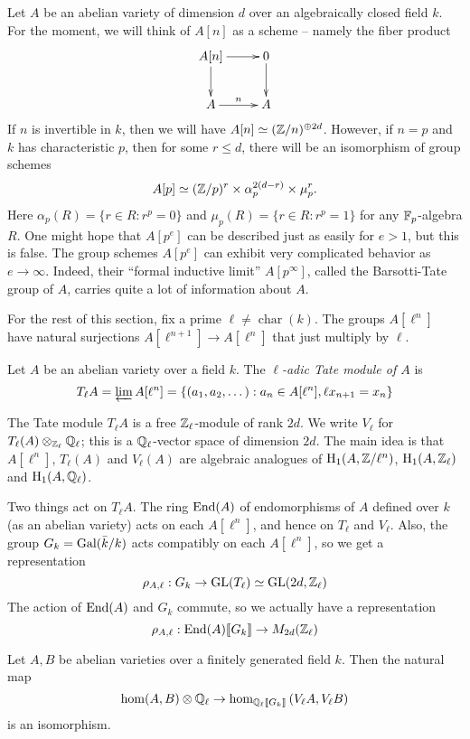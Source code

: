 \documentclass{article}
\begin{document}
Let $A$ be an abelian variety of dimension $d$ over an algebraically closed 
field $k$. For the moment, we will think of $A[n]$ as a scheme -- namely 
the fiber product 
\[\xymatrix{
  A[n] \ar[r] \ar[d] 
    & 0 \ar[d] \\
  A \ar[r]^-n 
    & A 
}\]
If $n$ is invertible in $k$, then we will have 
$A[n]\simeq (\mathbb{Z}/n)^{\oplus 2 d}$. However, if $n=p$ and $k$ has 
characteristic $p$, then for some $r\leqslant d$, 
there will be an isomorphism of group schemes 
\[
   A[p]\simeq (\mathbb{Z}/p)^r\times \alpha_p^{2(d-r)}\times \mu_p^r \text{.}
\]
Here $\alpha_p(R)=\{r\in R:r^p=0\}$ and $\mu_p(R)=\{r\in R:r^p=1\}$ for any 
$\mathbb{F}_p$-algebra $R$. One might hope that $A[p^e]$ can be described just as 
easily for $e>1$, but this is false. The group schemes $A[p^e]$ can exhibit 
very complicated behavior as $e\to \infty$. Indeed, their ``formal inductive 
limit'' $A[p^\infty]$, called the Barsotti-Tate group of $A$, carries quite a 
lot of information about $A$. 

For the rest of this section, fix a prime 
$\ell\ne \operatorname{char}(k)$. The groups $A[\ell^n]$ have 
natural surjections $A[\ell^{n+1}]\to A[\ell^n]$ that just multiply by 
$\ell$. 

\begin{definition}
Let $A$ be an abelian variety over a field $k$. The \emph{$\ell$-adic Tate 
module of $A$} is 
\[
  T_\ell A = \varprojlim A[\ell^n] = \{(a_1,a_2,\dots) : a_n\in A[\ell^n],\ell x_{n+1}=x_n\}
\]
\end{definition}

The Tate module $T_\ell A$ is a free $\mathbb{Z}_\ell$-module of rank $2 d$. We write 
$V_\ell$ for $T_\ell(A)\otimes_{\mathbb{Z}_\ell} \mathbb{Q}_\ell$; this is a 
$\mathbb{Q}_\ell$-vector space of dimension $2 d$. The main idea is that 
$A[\ell^n]$, $T_\ell(A)$ and $V_\ell(A)$ are algebraic analogues of 
$\operatorname{H}_1(A,\mathbb{Z}/\ell^n)$, $\operatorname{H}_1(A,\mathbb{Z}_\ell)$ and $\operatorname{H}_1(A,\mathbb{Q}_\ell)$. 

Two things act on $T_\ell A$. The ring $\operatorname{End}(A)$ of endomorphisms 
of $A$ defined over $k$ (as an abelian variety) acts on each $A[\ell^n]$, and 
hence on $T_\ell$ and $V_\ell$. Also, the group $G_k=\operatorname{Gal}(\bar k/k)$ acts 
compatibly on each $A[\ell^n]$, so we get a representation 
\[
  \rho_{A,\ell}:G_k\to \operatorname{GL}(T_\ell)\simeq \operatorname{GL}(2 d,\mathbb{Z}_\ell)
\]
The action of $\operatorname{End}(A)$ and $G_k$ commute, so we actually have a 
representation 
\[
  \rho_{A,\ell}:\operatorname{End}(A)\llbracket G_k\rrbracket \to M_{2 d}(\mathbb{Z}_\ell)
\]

\begin{theorem}[Faltings]
Let $A,B$ be abelian varieties over a finitely generated field $k$. Then 
the natural map 
\[
  \hom(A,B)\otimes\mathbb{Q}_\ell \to \hom_{\mathbb{Q}_\ell\llbracket G_k\rrbracket}\left(V_\ell A,V_\ell B\right)
\]
is an isomorphism. 
\end{theorem}
\end{document}
